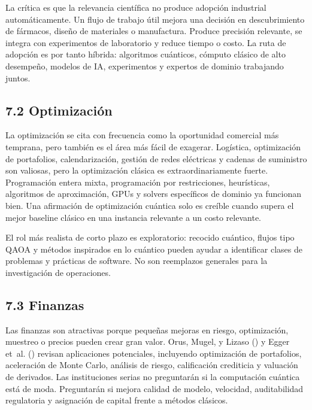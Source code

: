 \documentclass[
  11pt,
  letterpaper,
]{article}
\begin{document}
La crítica es que la relevancia científica no produce adopción
industrial automáticamente. Un flujo de trabajo útil mejora una decisión
en descubrimiento de fármacos, diseño de materiales o manufactura.
Produce precisión relevante, se integra con experimentos de laboratorio
y reduce tiempo o costo. La ruta de adopción es por tanto híbrida:
algoritmos cuánticos, cómputo clásico de alto desempeño, modelos de IA,
experimentos y expertos de dominio trabajando juntos.

\subsection{7.2 Optimización}\label{optimizaciuxf3n}

La optimización se cita con frecuencia como la oportunidad comercial más
temprana, pero también es el área más fácil de exagerar. Logística,
optimización de portafolios, calendarización, gestión de redes
eléctricas y cadenas de suministro son valiosas, pero la optimización
clásica es extraordinariamente fuerte. Programación entera mixta,
programación por restricciones, heurísticas, algoritmos de aproximación,
GPUs y solvers específicos de dominio ya funcionan bien. Una afirmación
de optimización cuántica solo es creíble cuando supera el mejor baseline
clásico en una instancia relevante a un costo relevante.

El rol más realista de corto plazo es exploratorio: recocido cuántico,
flujos tipo QAOA y métodos inspirados en lo cuántico pueden ayudar a
identificar clases de problemas y prácticas de software. No son
reemplazos generales para la investigación de operaciones.

\subsection{7.3 Finanzas}\label{finanzas}

Las finanzas son atractivas porque pequeñas mejoras en riesgo,
optimización, muestreo o precios pueden crear gran valor. Orus, Mugel, y
Lizaso () y Egger et~al.
() revisan aplicaciones potenciales,
incluyendo optimización de portafolios, aceleración de Monte Carlo,
análisis de riesgo, calificación crediticia y valuación de derivados.
Las instituciones serias no preguntarán si la computación cuántica está
de moda. Preguntarán si mejora calidad de modelo, velocidad,
auditabilidad regulatoria y asignación de capital frente a métodos
clásicos.
\end{document}
